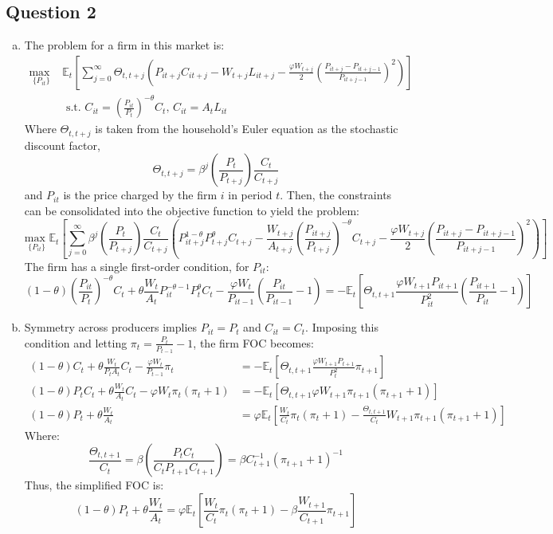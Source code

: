 \documentclass{article}
\newcommand{\usmax}[1]{\underset{#1}{\text{max }}}
\newcommand{\Et}[1]{\mathbb{E}_t\left[#1\right]}
\begin{document}
\pagebreak
\subsection*{Question 2}

\begin{enumerate}[(a)]

	\item The problem for a firm in this market is:
		{\small \begin{align*}
			\usmax{\{P_{it}\}}&\Et{\sum_{j=0}^\infty\Theta_{t,t+j}\left(P_{it+j}C_{it+j}-W_{t+j}L_{it+j} - \frac{\varphi W_{t+j}}{2}\left(\frac{P_{it+j}-P_{it+j-1}}{P_{it+j-1}}\right)^2\right)}	\\
				&\text{ s.t. } C_{it} = \left(\frac{P_{it}}{P_t}\right)^{-\theta}C_t\text{, }C_{it}=A_tL_{it}
		\end{align*} }
		Where $\Theta_{t,t+j}$ is taken from the household's Euler equation as the stochastic discount factor,
		\[
			\Theta_{t,t+j} = \beta^j\left(\frac{P_t}{P_{t+j}}\right)\frac{C_t}{C_{t+j}}
		\]
		and $P_{it}$ is the price charged by the firm $i$ in period $t$. Then, the constraints can be consolidated into the objective function to yield the problem:
		{\tiny \[
			\usmax{\{P_{it}\}}\Et{\sum_{j=0}^\infty\beta^j\left(\frac{P_t}{P_{t+j}}\right)\frac{C_t}{C_{t+j}}
				\left(P_{it+j}^{1-\theta}P_{t+j}^\theta C_{t+j}-\frac{W_{t+j}}{A_{t+j}}\left(\frac{P_{it+j}}{P_{t+j}}\right)^{-\theta}C_{t+j}-\frac{\varphi W_{t+j}}{2}\left(\frac{P_{it+j}-P_{it+j-1}}{P_{it+j-1}}\right)^2\right)}
		\] }
		The firm has a single first-order condition, for $P_{it}$:
		{\footnotesize \[
			(1-\theta)\left(\frac{P_{it}}{P_t}\right)^{-\theta}C_t + \theta\frac{W_t}{A_t}P_{it}^{-\theta-1}P_t^\theta C_t - 
				\frac{\varphi W_t}{P_{it-1}}\left(\frac{P_{it}}{P_{it-1}} - 1\right)
			= -\Et{\Theta_{t,t+1}\frac{\varphi W_{t+1}P_{it+1}}{P_{it}^2}\left(\frac{P_{it+1}}{P_{it}}-1\right)}
		\] }
		
	\item Symmetry across producers implies ${P_{it}=P_t}$ and ${C_{it}=C_t}$. Imposing this condition and letting ${\pi_t=\frac{P_t}{P_{t-1}}-1}$, the firm FOC becomes:
		{\small \begin{align*}
			(1-\theta)C_t + \theta\frac{W_t}{P_tA_t}C_t - \frac{\varphi W_t}{P_{t-1}}\pi_t
				&= -\Et{\Theta_{t,t+1}\frac{\varphi W_{t+1}P_{t+1}}{P_{t}^2}\pi_{t+1}}	\\
			(1-\theta)P_tC_t + \theta\frac{W_t}{A_t}C_t - \varphi W_t\pi_t(\pi_t+1)
				&= -\Et{\Theta_{t,t+1}\varphi W_{t+1}\pi_{t+1}(\pi_{t+1}+1)}	\\
			(1-\theta)P_t + \theta\frac{W_t}{A_t} 
				&= \varphi\Et{\frac{W_t}{C_t}\pi_t(\pi_t+1)-\frac{\Theta_{t,t+1}}{C_t} W_{t+1}\pi_{t+1}(\pi_{t+1}+1)}	
		\end{align*} }
		Where:
		\[
			\frac{\Theta_{t,t+1}}{C_t} = \beta\left(\frac{P_tC_t}{C_tP_{t+1}C_{t+1}}\right) = \beta C_{t+1}^{-1}(\pi_{t+1} + 1)^{-1}
		\]
		Thus, the simplified FOC is:
		\[
			(1-\theta)P_t + \theta\frac{W_t}{A_t} = \varphi\Et{\frac{W_t}{C_t}\pi_t(\pi_t+1)-\beta\frac{W_{t+1}}{C_{t+1}}\pi_{t+1}}
		\]
	

\end{enumerate}
\end{document}
